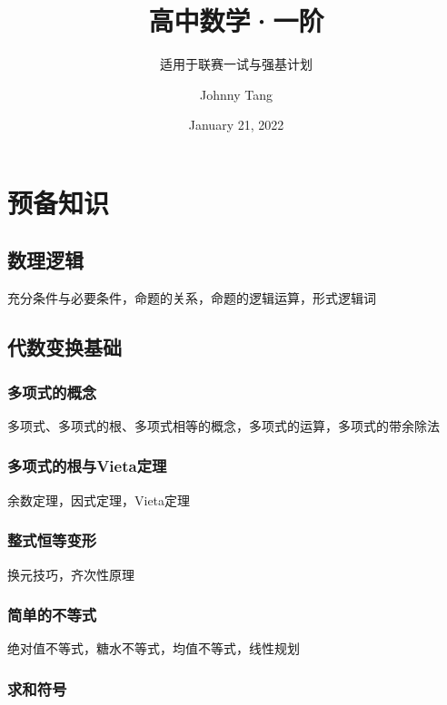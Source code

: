 \documentclass[lang=cn, zihao=4.5]{elegantbook}
\title{高中数学·一阶}
\subtitle{适用于联赛一试与强基计划}
\author{Johnny Tang}
\institute{DEEP Team}
\date{January 21, 2022}
\begin{document}
\maketitle

\frontmatter

\mainmatter

\tableofcontents

\newpage

\part{预备知识}

\setcounter{chapter}{-1}
\chapter{数理逻辑}

充分条件与必要条件，命题的关系，命题的逻辑运算，形式逻辑词

\chapter{代数变换基础}

\section{多项式的概念}

多项式、多项式的根、多项式相等的概念，多项式的运算，多项式的带余除法

\section{多项式的根与Vieta定理}

余数定理，因式定理，Vieta定理

\section{整式恒等变形}

换元技巧，齐次性原理

\section{简单的不等式}

绝对值不等式，糖水不等式，均值不等式，线性规划

\section{求和符号}
\end{document}
